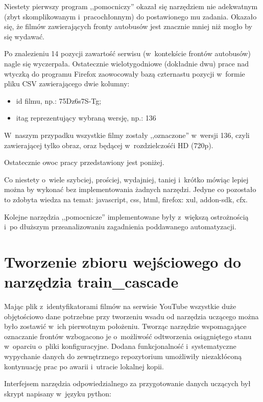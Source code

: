 Niestety pierwszy program ,,pomocniczy'' okazał się narzędziem nie adekwatnym
(zbyt skomplikowanym i~pracochłonnym) do postawionego mu zadania. Okazało się, że
filmów zawierających fronty autobusów jest znacznie mniej niż mogło by się wydawać.

Po znalezieniu 14 pozycji zawartość serwisu (w~kontekście frontów
autobusów) nagle się
wyczerpała. Ostatecznie wielotygodniowe (dokładnie dwu) prace nad wtyczką do programu 
Firefox zaowocowały bazą czternastu pozycji w~formie pliku CSV zawierającego dwie
kolumny:

\begin{itemize}
    \item id filmu, np.: 75Dz6s7S-Tg;
    \item itag reprezentujący wybraną wersję, np.: 136
\end{itemize}

W~naszym przypadku wszystkie filmy zostały ,,oznaczone'' w~wersji 136, czyli
zawierającej tylko obraz, oraz będącej w~rozdzielczośći HD (720p).

Ostatecznie owoc pracy przedstawiony jest poniżej.



Co niestety o~wiele szybciej, prościej, wydajniej, taniej i~krótko mówiąc lepiej można
by wykonać bez implementowania żadnych narzędzi. Jedyne co pozostało to zdobyta wiedza
na temat: javascript, css, html, firefox: xul, addon-sdk, cfx. 

Kolejne narzędzia ,,pomocnicze'' implementowane były z~większą 
ostrożnością i~po
dłuższym przeanalizowaniu zagadnienia poddawanego automatyzacji.

\section{Tworzenie zbioru wejściowego do narzędzia train\_cascade}

Mając plik z~identyfikatorami filmów na serwisie YouTube wszystkie duże objętościowo
dane potrzebne przy tworzeniu wsadu od narzędzia uczącego można było zostawić
w~ich pierwotnym położeniu. Tworząc narzędzie wspomagające oznaczanie frontów
wzbogacono je o~możliwość odtworzenia osiągniętego stanu w~oparciu o~pliki konfiguracyjne.
Dodana funkcjonalność i~systematyczne wypychanie danych do zewnętrznego repozytorium
umożliwiły niezakłóconą kontynuację prac po awarii i~utracie lokalnej kopii.

Interfejsem narzędzia odpowiedzialnego za przygotowanie danych uczących był skrypt
napisany w~języku python:

